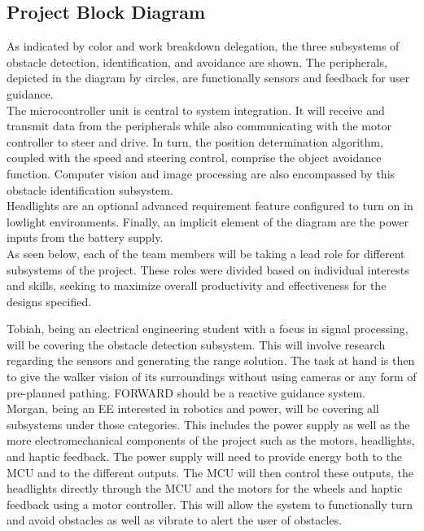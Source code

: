 \subsection{Project Block Diagram}

\noindent As indicated by color and work breakdown delegation, the three subsystems of obstacle detection, identification, and avoidance are shown. The peripherals, depicted in the diagram by circles, are functionally sensors and feedback for user guidance. \\

\noindent The microcontroller unit is central to system integration. It will receive and transmit data from the peripherals while also communicating with the motor controller to steer and drive. In turn, the position determination algorithm, coupled with the speed and steering control, comprise the object avoidance function. Computer vision and image processing are also encompassed by this obstacle identification subsystem. \\

\noindent Headlights are an optional advanced requirement feature configured to turn on in lowlight environments. Finally, an implicit element of the diagram are the power inputs from the battery supply.\\

\noindent As seen below, each of the team members will be taking a lead role for different subsystems of the project. These roles were divided based on individual interests and skills, seeking to maximize overall productivity and effectiveness for the designs specified.

\noindent Tobiah, being an electrical engineering student with a focus in signal processing, will be covering the obstacle detection subsystem. This will involve research regarding the sensors and generating the range solution. The task at hand is then to give the walker vision of its surroundings without using cameras or any form of pre-planned pathing. FORWARD should be a reactive guidance system. \\

\noindent Morgan, being an EE interested in robotics and power, will be covering all subsystems under those categories. This includes the power supply as well as the more electromechanical components of the project such as the motors, headlights, and haptic feedback. The power supply will need to provide energy both to the MCU and to the different outputs. The MCU will then control these outputs, the headlights directly through the MCU and the motors for the wheels and haptic feedback using a motor controller. This will allow the system to functionally turn and avoid obstacles as well as vibrate to alert the user of obstacles. \\

